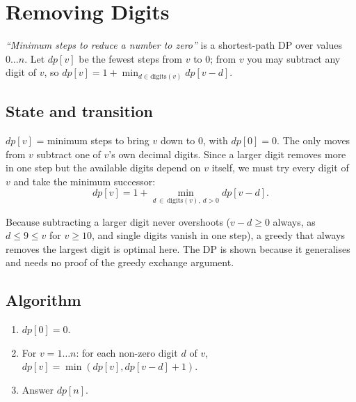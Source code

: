 \section{Removing Digits}
\label{sec:cses-removing-digits}


\begin{patternbox}
\emph{``Minimum steps to reduce a number to zero''} is a shortest-path
DP over values $0\ldots n$. Let $\textit{dp}[v]$ be the fewest steps from
$v$ to $0$; from $v$ you may subtract any digit of $v$, so
$\textit{dp}[v]=1+\min_{d\in\text{digits}(v)}\textit{dp}[v-d]$.
\end{patternbox}

\subsection*{State and transition}

$\textit{dp}[v]$ = minimum steps to bring $v$ down to $0$, with
$\textit{dp}[0]=0$. The only moves from $v$ subtract one of $v$'s own
decimal digits. Since a larger digit removes more in one step but the
available digits depend on $v$ itself, we must try every digit of $v$ and
take the minimum successor:
\[
  \textit{dp}[v]=1+\min_{d\,\in\,\text{digits}(v),\ d>0}\textit{dp}[v-d].
\]

\begin{ideabox}
Because subtracting a larger digit never overshoots ($v-d\ge0$ always,
as $d\le9\le v$ for $v\ge10$, and single digits vanish in one step), a
greedy that always removes the largest digit is optimal here. The DP is
shown because it generalises and needs no proof of the greedy exchange
argument.
\end{ideabox}

\subsection*{Algorithm}

\begin{enumerate}
  \item $\textit{dp}[0]=0$.
  \item For $v=1\ldots n$: for each non-zero digit $d$ of $v$,
        $\textit{dp}[v]=\min(\textit{dp}[v], \textit{dp}[v-d]+1)$.
  \item Answer $\textit{dp}[n]$.
\end{enumerate}

